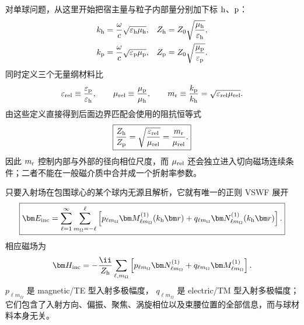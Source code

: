 对单球问题，从这里开始把宿主量与粒子内部量分别加下标 ${\rm h}$、${\rm p}$：
\begin{align}
 k_{\rm h}&=\frac{\omega}{c}\sqrt{\varepsilon_{\rm h}\mu_{\rm h}},
&
 Z_{\rm h}&=Z_0\sqrt{\frac{\mu_{\rm h}}{\varepsilon_{\rm h}}},\\
 k_{\rm p}&=\frac{\omega}{c}\sqrt{\varepsilon_{\rm p}\mu_{\rm p}},
&
 Z_{\rm p}&=Z_0\sqrt{\frac{\mu_{\rm p}}{\varepsilon_{\rm p}}}.
\label{eq:sphere-medium-kZ}
\end{align}
同时定义三个无量纲材料比
\begin{equation}
 \varepsilon_{\rm rel}\equiv\frac{\varepsilon_{\rm p}}{\varepsilon_{\rm h}},
 \qquad
 \mu_{\rm rel}\equiv\frac{\mu_{\rm p}}{\mu_{\rm h}},
 \qquad
 m_{\rm r}\equiv\frac{k_{\rm p}}{k_{\rm h}}
 =\sqrt{\varepsilon_{\rm rel}\mu_{\rm rel}}.
 \label{eq:sphere-relative-material-def}
\end{equation}
由这些定义直接得到后面边界匹配会使用的阻抗恒等式
\begin{equation}
 \boxed{
 \frac{Z_{\rm h}}{Z_{\rm p}}
 =\sqrt{\frac{\varepsilon_{\rm rel}}{\mu_{\rm rel}}}
 =\frac{m_{\rm r}}{\mu_{\rm rel}}.}
 \label{eq:impedance-ratio-mie}
\end{equation}
因此 $m_{\rm r}$ 控制内部与外部的径向相位尺度，而 $\mu_{\rm rel}$ 还会独立进入切向磁场连续条件；二者不能在一般磁介质中合并成一个折射率参数。

只要入射场在包围球心的某个球内无源且解析，它就有唯一的正则 VSWF 展开
\begin{equation}
\boxed{
\bm E_{\rm inc}
=\sum_{\ell=1}^{\infty}
\sum_{m_{\Omega}=-\ell}^{\ell}
\left[
 p_{\ell m_{\Omega}}\bm M_{\ell m_{\Omega}}^{(1)}(k_{\rm h}\bm r)
+q_{\ell m_{\Omega}}\bm N_{\ell m_{\Omega}}^{(1)}(k_{\rm h}\bm r)
\right].}
\label{eq:general-inc-vswf}
\end{equation}
相应磁场为
\begin{equation}
\bm H_{\rm inc}
=-\frac{\ii}{Z_{\rm h}}
\sum_{\ell,m_{\Omega}}
\left[
 p_{\ell m_{\Omega}}\bm N_{\ell m_{\Omega}}^{(1)}
+q_{\ell m_{\Omega}}\bm M_{\ell m_{\Omega}}^{(1)}
\right].
\label{eq:general-inc-vswf-H}
\end{equation}
$p_{\ell m_{\Omega}}$ 是 magnetic/TE 型入射多极幅度，
$q_{\ell m_{\Omega}}$ 是 electric/TM 型入射多极幅度；它们包含了入射方向、偏振、聚焦、涡旋相位以及束腰位置的全部信息，而与球材料本身无关。

